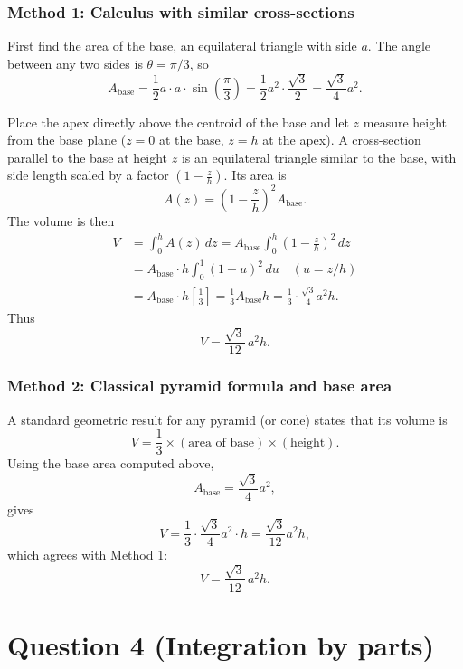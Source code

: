 \documentclass[12pt]{article}
\begin{document}
\subsubsection*{Method 1: Calculus with similar cross-sections}

First find the area of the base, an equilateral triangle with side \(a\). The angle between any two sides is \(\theta=\pi/3\), so
\[
A_{\text{base}}
= \frac{1}{2}a\cdot a\cdot \sin\left(\frac{\pi}{3}\right)
= \frac{1}{2}a^{2}\cdot\frac{\sqrt{3}}{2}
= \frac{\sqrt{3}}{4}a^{2}.
\]

Place the apex directly above the centroid of the base and let \(z\) measure height from the base plane (\(z=0\) at the base, \(z=h\) at the apex). A cross-section parallel to the base at height \(z\) is an equilateral triangle similar to the base, with side length scaled by a factor \((1-\frac{z}{h})\). Its area is
\[
A(z) = \left(1-\frac{z}{h}\right)^{2} A_{\text{base}}.
\]
The volume is then
\begin{align*}
V
&=\int_{0}^{h} A(z)\,dz
= A_{\text{base}}\int_{0}^{h}\left(1-\frac{z}{h}\right)^{2}\,dz\\
&= A_{\text{base}}\cdot h\int_{0}^{1}(1-u)^{2}\,du
\quad (u=z/h)\\
&= A_{\text{base}}\cdot h\left[\frac{1}{3}\right]
= \frac{1}{3}A_{\text{base}}h
= \frac{1}{3}\cdot\frac{\sqrt{3}}{4}a^{2}h.
\end{align*}
Thus
\[
\boxed{V=\frac{\sqrt{3}}{12}\,a^{2}h.}
\]

\subsubsection*{Method 2: Classical pyramid formula and base area}

A standard geometric result for any pyramid (or cone) states that its volume is
\[
V = \frac{1}{3}\times (\text{area of base}) \times (\text{height}).
\]
Using the base area computed above,
\[
A_{\text{base}}=\frac{\sqrt{3}}{4}a^{2},
\]
gives
\[
V = \frac{1}{3}\cdot \frac{\sqrt{3}}{4}a^{2}\cdot h
= \frac{\sqrt{3}}{12}a^{2}h,
\]
which agrees with Method 1:
\[
\boxed{V=\frac{\sqrt{3}}{12}\,a^{2}h.}
\]

\newpage


\section*{Question 4 (Integration by parts)}
\end{document}
